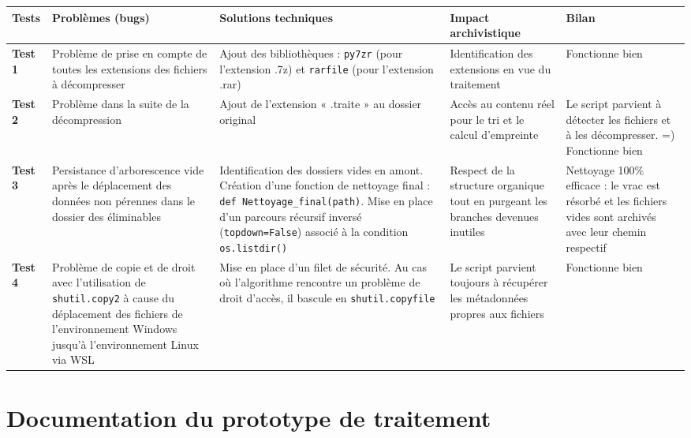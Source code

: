 \begin{longtable}{|p{}|p{}|p{}|p{}|p{}|}
	\hline
	\textbf{Tests} &
	\textbf{Problèmes (bugs)} &
	\textbf{Solutions techniques} &
	\textbf{Impact archivistique} &
	\textbf{Bilan} \\
	\hline
	
	\textbf{Test 1} &
	Problème de prise en compte de toutes les extensions des fichiers à décompresser &
	Ajout des bibliothèques : \texttt{py7zr} (pour l'extension .7z) et \texttt{rarfile} (pour l'extension .rar) &
	Identification des extensions en vue du traitement &
	Fonctionne bien \\
	\hline
	
	\textbf{Test 2} &
	Problème dans la suite de la décompression &
	Ajout de l'extension « .traite » au dossier original &
	Accès au contenu réel pour le tri et le calcul d'empreinte &
	Le script parvient à détecter les fichiers et à les décompresser. =) Fonctionne bien \\
	\hline
	
	\textbf{Test 3} &
	Persistance d'arborescence vide après le déplacement des données non pérennes dans le dossier des éliminables &
	Identification des dossiers vides en amont. Création d'une fonction de nettoyage final : \texttt{def Nettoyage\_final(path)}. Mise en place d'un parcours récursif inversé (\texttt{topdown=False}) associé à la condition \texttt{os.listdir()} &
	Respect de la structure organique tout en purgeant les branches devenues inutiles &
	Nettoyage 100\% efficace : le vrac est résorbé et les fichiers vides sont archivés avec leur chemin respectif \\
	\hline
	
	\textbf{Test 4} &
	Problème de copie et de droit avec l'utilisation de \texttt{shutil.copy2} à cause du déplacement des fichiers de l'environnement Windows jusqu'à l'environnement Linux via WSL &
	Mise en place d'un filet de sécurité. Au cas où l'algorithme rencontre un problème de droit d'accès, il bascule en \texttt{shutil.copyfile} &
	Le script parvient toujours à récupérer les métadonnées propres aux fichiers &
	Fonctionne bien \\
	\hline
	
\end{longtable}


\chapter[Documentation des outils de traitements]{Documentation du prototype de traitement}
\label{annexe:documentation-scripts}

